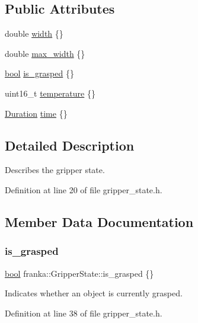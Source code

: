 \subsection*{Public Attributes}
\begin{DoxyCompactItemize}
\item 
double \hyperlink{structfranka_1_1GripperState_adf095f446ec39a9a48e120b209dcd6e9}{width} \{\}
\item 
double \hyperlink{structfranka_1_1GripperState_ab71a26356c2898c49609bf991843e166}{max\+\_\+width} \{\}
\item 
\hyperlink{classbool}{bool} \hyperlink{structfranka_1_1GripperState_aa65b46313e740454ead9c9ea27e7bf8d}{is\+\_\+grasped} \{\}
\item 
uint16\+\_\+t \hyperlink{structfranka_1_1GripperState_aa6733fa786dbf3b073acbaf3779e34b3}{temperature} \{\}
\item 
\hyperlink{classfranka_1_1Duration}{Duration} \hyperlink{structfranka_1_1GripperState_a80bf474b0e4351e2eefab62d1bd10c07}{time} \{\}
\end{DoxyCompactItemize}


\subsection{Detailed Description}
Describes the gripper state. 

Definition at line 20 of file gripper\+\_\+state.\+h.



\subsection{Member Data Documentation}
\mbox{\label{structfranka_1_1GripperState_aa65b46313e740454ead9c9ea27e7bf8d}} 
\subsubsection{\texorpdfstring{is\+\_\+grasped}{is\_grasped}}
{\footnotesize\ttfamily \hyperlink{classbool}{bool} franka\+::\+Gripper\+State\+::is\+\_\+grasped \{\}}

Indicates whether an object is currently grasped. 

Definition at line 38 of file gripper\+\_\+state.\+h.



